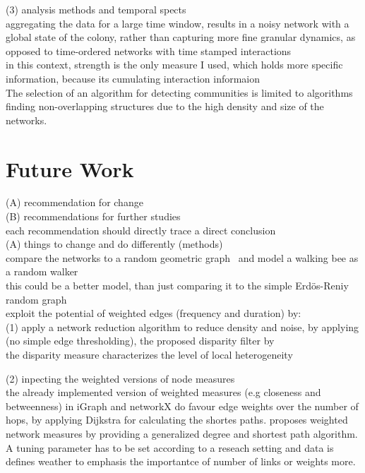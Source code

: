 (3) analysis methods and temporal spects\\
aggregating the data for a large time window, results in a noisy network with a global state of the colony, rather than capturing more fine granular dynamics, as opposed to time-ordered networks with time stamped interactions\\
in this context, strength is the only measure I used, which holds more specific information, because its cumulating interaction informaion\\
The selection of an algorithm for detecting communities is limited to algorithms finding non-overlapping structures due to the high density and size of the networks.

\section{Future Work}
(A) recommendation for change\\
(B) recommendations for further studies\\
each recommendation should directly trace a direct conclusion\\


(A) things to change and do differently (methods)\\

compare the networks to a random geometric graph~\cite{rgg2002} and model a walking bee as a random walker\\
this could be a better model, than just comparing it to the simple Erdös-Reniy random graph\\

exploit the potential of weighted edges (frequency and duration) by:\\

(1) apply a network reduction algorithm to reduce density and noise, by applying (no simple edge thresholding), the proposed disparity filter by \textcite{serrano2009extracting}\\
the disparity measure characterizes the level of local heterogeneity~\cite{barthelemy2003spatial}

(2) inpecting the weighted versions of node measures\\
the already implemented version of weighted measures (e.g closeness and betweenness) in iGraph and networkX do favour edge weights over the number of hops, by applying Dijkstra for calculating the shortes paths. \textcite{opsahl2010node} proposes weighted network measures by providing a generalized degree and shortest path algorithm. A tuning parameter has to be set according to a reseach setting and data is defines weather to emphasis the importantce of number of links or weights more.

